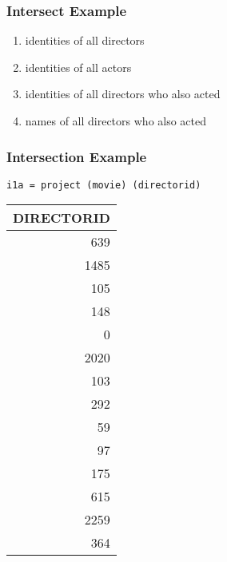 \documentclass[dvipsnames]{beamer}
\theoremstyle{plain}
\begin{document}
\begin{frame}
  \frametitle{Intersect Example}

  \begin{example}
    \pause
    \begin{enumerate}
      \item identities of all directors

      \pause
      \item identities of all actors

      \pause
      \item identities of all directors who also acted

      \pause
      \item names of all directors who also acted
    \end{enumerate}
  \end{example}
\end{frame}

\begin{frame}[fragile]
  \frametitle{Intersection Example}

  \begin{example}
    \begin{lstlisting}
i1a = project (movie) (directorid)
    \end{lstlisting}

    \pause
    \begin{tiny}
    \begin{table}
      \begin{tabular}{|r|}\hline
DIRECTORID\\\hline\hline
       639\\\hline
      1485\\\hline
       105\\\hline
       148\\\hline
         0\\\hline
      2020\\\hline
       103\\\hline
       292\\\hline
        59\\\hline
        97\\\hline
       175\\\hline
       615\\\hline
      2259\\\hline
       364\\\hline
      \end{tabular}
    \end{table}
    \end{tiny}
  \end{example}
\end{frame}
\end{document}
